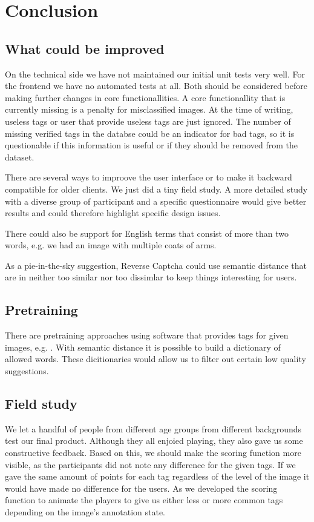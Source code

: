 \section{Conclusion}
\label{g14:sec:conclusion}

\subsection{What could be improved}
\label{g14:sec:conclusion:improved}
On the technical side we have not maintained our initial unit tests very well. For the frontend we have no automated tests at all. Both should be considered before making further changes in core functionallities.
A core functionallity that is currently missing is a penalty for misclassified images. At the time of writing, useless tags or user that provide useless tags are just ignored. The number of missing verified tags in the databse could be an indicator for bad tags, so it is questionable if this information is useful or if they should be removed from the dataset.

There are several ways to improove the user interface or to make it backward compatible for older clients. We just did a tiny field study. A more detailed study with a diverse group of participant and a specific questionnaire would give better results and could therefore highlight specific design issues.

There could also be support for English terms that consist of more than two words, e.g. we had an image with multiple coats of arms.

As a pie-in-the-sky suggestion, Reverse Captcha could use semantic distance that are in neither too similar nor too dissimlar to keep things interesting for users.


\subsection{Pretraining}
\label{g14:sec:conclusion:pretraining}
There are pretraining approaches using software that provides tags for given images, e.g. \cite{simonyan2014very}. With semantic distance it is possible to build a dictionary of allowed words. These dicitionaries would allow us to filter out certain low quality suggestions.

\subsection{Field study}
\label{g14:sec:conclusion:fieldstudy}
We let a handful of people from different age  groups from different backgrounds test our final product.
Although they all enjoied playing, they also gave us some constructive feedback.
Based on this, we should make the scoring function more visible, as the participants did not note any difference for the given tags.
If we gave the same amount of points for each tag regardless of the level of the image it would have made no difference for the users.
As we developed the scoring function to animate the players to give us either less or more common tags depending on the image's annotation state.

